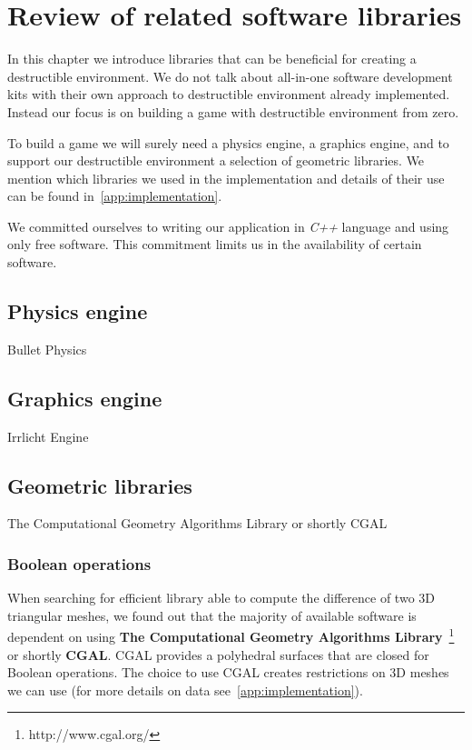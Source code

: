 \chapter{Review of related software libraries}
\label{chapt:technology}
In this chapter we introduce libraries that can be beneficial for creating a destructible environment. We do not talk about all-in-one software development kits with their own approach to destructible environment already implemented. Instead our focus is on building a game with destructible environment from zero.  

To build a game we will surely need a physics engine, a graphics engine, and to support our destructible environment a selection of geometric libraries. We mention which libraries we used in the implementation and details of their use can be found in~\cref{app:implementation}.

We committed ourselves to writing our application in \emph{C++} language and using only free software. This commitment limits us in the  availability of certain software.

\section{Physics engine}
Bullet Physics


\section{Graphics engine}
Irrlicht Engine

\section{Geometric libraries}
The Computational Geometry Algorithms Library or shortly CGAL

\subsection{Boolean operations}

When searching for efficient library able to compute the difference of two 3D triangular meshes, we found out that the majority of available software is dependent on using \textbf{The Computational Geometry Algorithms Library}~\footnote{http://www.cgal.org/} or shortly \textbf{CGAL}. CGAL provides a polyhedral surfaces that are closed for Boolean operations. The choice to use CGAL creates restrictions on 3D meshes we can use (for more details on data see~\cref{app:implementation}).

